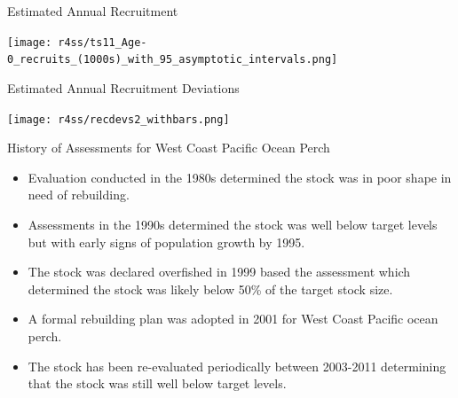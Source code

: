 \documentclass[pdf]{beamer}\usepackage[]{graphicx}\usepackage[]{color}
\begin{document}
\begin{frame}{Estimated Annual Recruitment}
  \begin{center}
    \texttt{[image: r4ss/ts11\_Age-0\_recruits\_(1000s)\_with\_95\_asymptotic\_intervals.png]}
  \end{center}
\end{frame}

\begin{frame}{Estimated Annual Recruitment Deviations}
  \begin{center}
    \texttt{[image: r4ss/recdevs2\_withbars.png]}
  \end{center}
\end{frame}

\begin{frame}{History of Assessments for West Coast Pacific Ocean Perch}
  \begin{itemize}
    \item Evaluation conducted in the 1980s determined the stock was in poor shape in need of rebuilding.
    \item Assessments in the 1990s determined the stock was well below target levels but with early signs of population growth by 1995. 
    \item The stock was declared overfished in 1999 based the assessment which determined the stock was likely below 50\% of the target stock size.
    \item A formal rebuilding plan was adopted in 2001 for West Coast Pacific ocean perch.
    \item The stock has been re-evaluated periodically between 2003-2011 determining that the stock was still well below target levels. 
  \end{itemize}
\end{frame}
\end{document}
